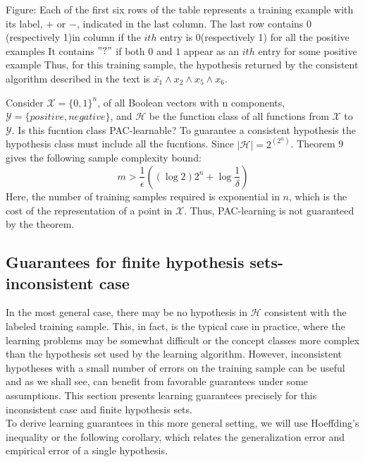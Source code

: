 \begin{example}
	\noindent Figure: Each of the first six rows of the table represents a training example with
	its label, $+$ or $-$, indicated in the last column. The last row contains $0$(respectively
	1)in column if the $ith$ entry is $0$(respectively 1) for all the positive examples
	It contains $"?"$ if both $0$ and $1$ appear as an $ith$ entry for some positive example
	Thus, for this training sample, the hypothesis returned by the consistent algorithm
	described in the text is $\bar{x_1}\wedge x_2 \wedge x_5 \wedge x_6$.
\end{example}
\begin{example}
	Consider $\mathcal{X}=\{0,1\}^n$, of all Boolean vectors with n components, $\mathcal{Y}=\{positive, negative\}$, and $\mathcal{H}$ be the function class of all functions from $\mathcal{X}$ to $\mathcal{Y}$. Is this fucntion class PAC-learnable?
	To guarantee a consistent hypothesis the hypothesis class must include all the fucntions. Since $|\mathcal{H}|=2^{(2^n)}$. Theorem 9 gives the following sample complexity bound:
	\begin{equation}
	m>\frac{1}{\epsilon}\left((\log2)2^n+\log\frac{1}{\delta}\right)
	\end{equation}
	Here, the number of training samples required is exponential in $n$, which is the cost
	of the representation of a point in $\mathcal{X}$. Thus, PAC-learning is not guaranteed by
	the theorem.
\end{example}

\subsection{Guarantees for finite hypothesis sets-inconsistent case}
In the most general case, there may be no hypothesis in $\mathcal{H}$ consistent with the labeled training sample. This, in fact, is the typical case in practice, where the learning problems may be somewhat difficult or the concept classes more complex than the hypothesis set used by the learning algorithm. However, inconsistent hypotheses with a small number of errors on the training sample can be useful and as we shall see, can benefit from favorable guarantees under some assumptions. This section presents learning guarantees precisely for this inconsistent case and finite hypothesis sets.\\
To derive learning guarantees in this more general setting, we will use Hoeffding's inequality or the following corollary, which relates the generalization error and empirical error of a single hypothesis.

